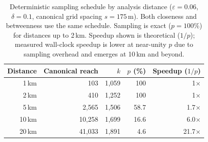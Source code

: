 \begin{table}[htbp]
\centering
\caption{Deterministic sampling schedule by analysis distance ($\varepsilon = 0.06$, $\delta = 0.1$, canonical grid spacing $s = 175\,\text{m}$). Both closeness and betweenness use the same schedule. Sampling is exact ($p = 100\%$) for distances up to 2\,km. Speedup shown is theoretical ($1/p$); measured wall-clock speedup is lower at near-unity $p$ due to sampling overhead and emerges at 10\,km and beyond.}
\label{tab:distance_lookup}
\begin{tabular}{rrrrr}
\toprule
\textbf{Distance} & \textbf{Canonical reach} & \textbf{$k$} & \textbf{$p$ (\%)} & \textbf{Speedup ($1/p$)} \\
\midrule
1\,km & 103 & 1{,}059 & 100 & 1$\times$ \\
2\,km & 410 & 1{,}252 & 100 & 1$\times$ \\
5\,km & 2{,}565 & 1{,}506 & 58.7 & 1.7$\times$ \\
10\,km & 10{,}258 & 1{,}699 & 16.6 & 6.0$\times$ \\
20\,km & 41{,}033 & 1{,}891 & 4.6 & 21.7$\times$ \\
\bottomrule
\end{tabular}
\end{table}
